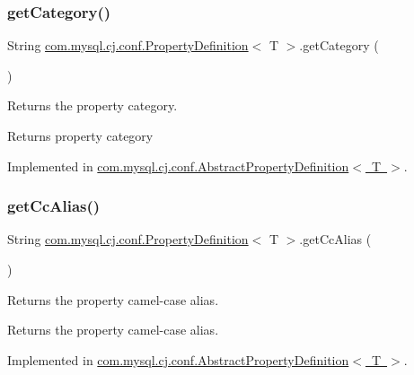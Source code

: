 \subsubsection{\texorpdfstring{get\+Category()}{getCategory()}}
{\footnotesize\ttfamily String \mbox{\hyperlink{interfacecom_1_1mysql_1_1cj_1_1conf_1_1_property_definition}{com.\+mysql.\+cj.\+conf.\+Property\+Definition}}$<$ T $>$.get\+Category (\begin{DoxyParamCaption}{ }\end{DoxyParamCaption})}

Returns the property category.

\begin{DoxyReturn}{Returns}
property category 
\end{DoxyReturn}


Implemented in \mbox{\hyperlink{classcom_1_1mysql_1_1cj_1_1conf_1_1_abstract_property_definition_a42152845862ecc58cab2f76ff8359e5c}{com.\+mysql.\+cj.\+conf.\+Abstract\+Property\+Definition$<$ T $>$}}.

\mbox{\label{interfacecom_1_1mysql_1_1cj_1_1conf_1_1_property_definition_acc0fa0247711c6fdacc8eff41cf31259}} 
\subsubsection{\texorpdfstring{get\+Cc\+Alias()}{getCcAlias()}}
{\footnotesize\ttfamily String \mbox{\hyperlink{interfacecom_1_1mysql_1_1cj_1_1conf_1_1_property_definition}{com.\+mysql.\+cj.\+conf.\+Property\+Definition}}$<$ T $>$.get\+Cc\+Alias (\begin{DoxyParamCaption}{ }\end{DoxyParamCaption})}

Returns the property camel-\/case alias.

\begin{DoxyReturn}{Returns}
the property camel-\/case alias. 
\end{DoxyReturn}


Implemented in \mbox{\hyperlink{classcom_1_1mysql_1_1cj_1_1conf_1_1_abstract_property_definition_af42f8fd9bb3feef2843558105b4246a1}{com.\+mysql.\+cj.\+conf.\+Abstract\+Property\+Definition$<$ T $>$}}.

